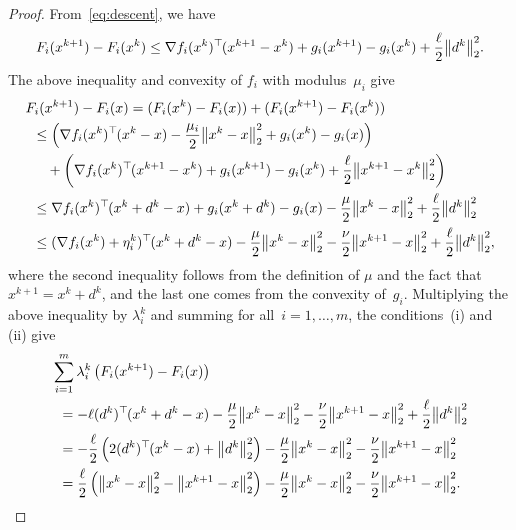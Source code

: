 \documentclass[../../main]{subfiles}
\begin{document}
\begin{proof}
    From~\cref{eq:descent}, we have
	\[
        F_i(x^{k + 1}) - F_i(x^k) \le \nabla f_i(x^k)^\T (x^{k + 1} - x^k) + g_i(x^{k + 1}) - g_i(x^k) + \frac{\ell}{2} \norm*{ d^k}_2^2
	.\]
    The above inequality and convexity of $f_i$ with modulus~$\mu_i$ give
    \[
        \begin{split}
            \MoveEqLeft[.5] F_i(x^{k + 1}) - F_i(x) = ( F_i(x^k) - F_i(x) ) + ( F_i(x^{k + 1}) - F_i(x^k) ) \\
        &\le \left(\nabla f_i(x^k)^\T (x^k - x) - \frac{\mu_i}{2} \norm*{ x^k - x}_2^2 + g_i(x^k) - g_i(x)\right) \\
        &\quad + \left(\nabla f_i(x^k)^\T (x^{k + 1} - x^k) + g_i(x^{k + 1}) - g_i(x^k) + \frac{\ell}{2} \norm*{ x^{k + 1} - x^k}_2^2\right) \\
        &\le \nabla f_i(x^k)^\T (x^k + d^k - x) + g_i(x^k + d^k) - g_i(x)  - \frac{\mu}{2} \norm*{ x^k - x}_2^2 + \frac{\ell}{2} \norm*{ d^k}_2^2 \\
        &\le (\nabla f_i(x^k) + \eta_i^k)^\T (x^k + d^k - x)
        - \frac{\mu}{2} \norm*{ x^k - x}_2^2 - \frac{\nu}{2} \norm*{ x^{k + 1} - x }_2^2 + \frac{\ell}{2} \norm*{d^k}_2^2
        ,\end{split}
    \]
	where the second inequality follows from the definition of $\mu$ and the fact that $x^{k + 1} = x^k + d^k$, and the last one comes from the convexity of~$g_i$. Multiplying the above inequality by $\lambda_i^k$ and summing for all~$i = 1, \dots, m$, the conditions~(i) and (ii) give
    \[
        \begin{split}
            \MoveEqLeft[.5] \sum_{i = 1}^m \lambda_i^k \left( F_i(x^{k + 1}) - F_i(x) \right) \\
        &= {- \ell (d^k)^\T (x^k + d^k - x) - \frac{\mu}{2} \norm*{ x^k - x}_2^2 - \frac{\nu}{2} \norm*{ x^{k + 1} - x }_2^2 + \frac{\ell}{2} \norm*{ d^k}_2^2} \\
        &=  - \frac{\ell}{2} \left( 2 (d^k)^\T (x^k - x) + \norm*{ d^k }_2^2 \right) - \frac{\mu}{2} \norm*{ x^k - x}_2^2 - \frac{\nu}{2} \norm*{ x^{k + 1} - x }_2^2 \\
        &=  \frac{\ell}{2} \left( \norm*{ x^k - x}_2^2 - \norm*{ x^{k + 1} - x}_2^2 \right) - \frac{\mu}{2} \norm*{ x^k - x}_2^2 - \frac{\nu}{2} \norm*{ x^{k + 1} - x }_2^2
        .\end{split}
    \]
\end{proof}
\end{document}
